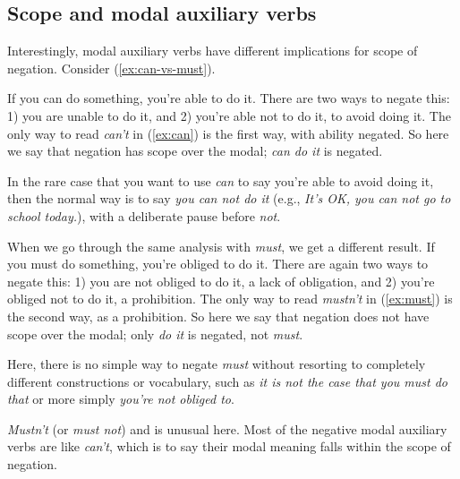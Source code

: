 \subsection{Scope and modal auxiliary verbs}

Interestingly, modal auxiliary verbs have different implications for scope of negation. Consider (\ref{ex:can-vs-must}).

\begin{multicols}{2}
\ea \label{ex:can-vs-must}
    \ea \label{ex:can}
    \z
    \ex \label{ex:must}
        \z
    \z
\z
\end{multicols}

If you can do something, you're able to do it. There are two ways to negate this: 1) you are unable to do it, and 2) you're able not to do it, to avoid doing it. The only way to read \textit{can't} in (\ref{ex:can}) is the first way, with ability negated. So here we say that negation has scope over the modal; \textit{can do it} is negated.

In the rare case that you want to use \textit{can} to say you're able to avoid doing it, then the normal way is to say \textit{you can not do it} (e.g., \textit{It's OK, you can not go to school today.}), with a deliberate pause before \textit{not}. 

When we go through the same analysis with \textit{must}, we get a different result. If you must do something, you're obliged to do it. There are again two ways to negate this: 1) you are not obliged to do it, a lack of obligation, and 2) you're obliged not to do it, a prohibition. The only way to read \textit{mustn't} in (\ref{ex:must}) is the second way, as a prohibition. So here we say that negation does not have scope over the modal; only \textit{do it} is negated, not \textit{must}.

Here, there is no simple way to negate \textit{must} without resorting to completely different constructions or vocabulary, such as \textit{it is not the case that you must do that} or more simply \textit{you're not obliged to}.

\textit{Mustn't} (or \textit{must not}) and  is unusual here. Most of the negative modal auxiliary verbs are like \textit{can't}, which is to say their modal meaning falls within the scope of negation.

